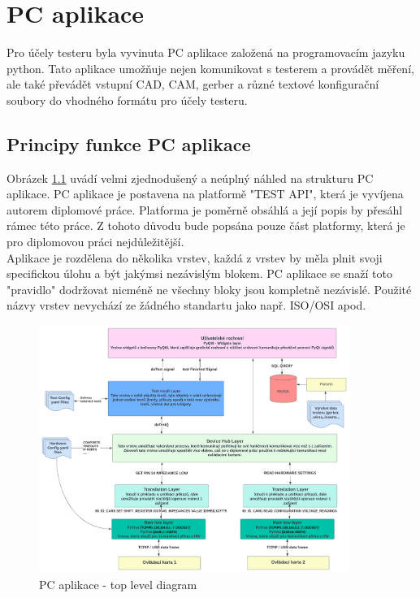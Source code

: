 \chapter{PC aplikace}
Pro účely testeru byla vyvinuta PC aplikace založená na programovacím jazyku python. Tato aplikace umožňuje
nejen komunikovat s testerem a provádět měření, ale také převádět vstupní CAD, CAM, gerber a různé textové konfigurační
soubory do vhodného formátu pro účely testeru.\\




\section{Principy funkce PC aplikace}
Obrázek \ref{fig: PCAPP top level diagram} uvádí velmi zjednodušený a neúplný náhled na strukturu PC aplikace.
PC aplikace je postavena na platformě "TEST API", která je vyvíjena autorem diplomové práce. Platforma je poměrně obsáhlá
a její popis by přesáhl rámec této práce. Z tohoto důvodu bude popsána pouze část platformy, která je pro diplomovou práci nejdůležitější.\\

Aplikace je rozdělena do několika vrstev, každá z vrstev by měla plnit svoji specifickou úlohu a být jakýmsi nezávislým blokem.
PC aplikace se snaží toto "pravidlo" dodržovat nicméně ne všechny bloky jsou kompletně nezávislé.
Použité názvy vrstev nevychází ze žádného standartu jako např. ISO/OSI apod.\\

\begin{figure}[ht!]
    \centering
    \includegraphics[width = 0.9\textwidth]{obrazky/PC_app_diagram.png}
    \caption{PC aplikace - top level diagram}
    \label{fig: PCAPP top level diagram}
\end{figure}


